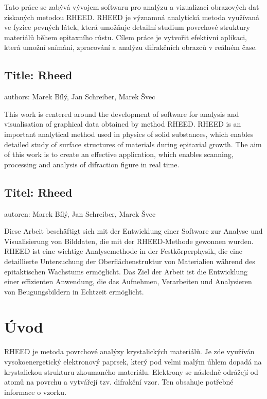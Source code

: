 \documentclass{article}
\begin{document}
Tato práce se zabývá vývojem softwaru pro analýzu a vizualizaci obrazových dat získaných metodou RHEED. RHEED je významná analytická metoda využívaná ve fyzice pevných látek, která umožňuje detailní studium povrchové struktury materiálů během epitaxního růstu. Cílem práce je vytvořit efektivní aplikaci, která umožní snímání, zpracování a analýzu difrakčních obrazců v reálném čase.

\subsection*{Title: Rheed}
authors: Marek Bílý, Jan Schreiber, Marek Švec
\vspace{0.5cm}

This work is centered around the development of software for analysis and visualisation of graphical data obtained by method RHEED. RHEED is an important analytical method used in physics of solid substances, which enables detailed study of surface structures of materials during epitaxial growth. The aim of this work is to create an effective application, which enables scanning, processing and analysis of difraction figure in real time.

\subsection*{Titel: Rheed}
autoren: Marek Bílý, Jan Schreiber, Marek Švec
\vspace{0.5cm}

Diese Arbeit beschäftigt sich mit der Entwicklung einer Software zur Analyse und Visualisierung von Bilddaten, die mit der RHEED-Methode gewonnen wurden. RHEED ist eine wichtige Analysemethode in der Festkörperphysik, die eine detaillierte Untersuchung der Oberflächenstruktur von Materialien während des epitaktischen Wachstums ermöglicht. Das Ziel der Arbeit ist die Entwicklung einer effizienten Anwendung, die das Aufnehmen, Verarbeiten und Analysieren von Beugungsbildern in Echtzeit ermöglicht. 
\newpage

\section{Úvod}
    RHEED je metoda povrchové analýzy krystalických materiálů. Je zde využíván vysokoenergetický elektronový paprsek, který pod velmi malým úhlem dopadá na krystalickou strukturu zkoumaného materiálu. Elektrony se následně odrážejí od atomů na povrchu a vytvářejí tzv. difrakční vzor. Ten obsahuje potřebné informace o vzorku.\\
\end{document}
